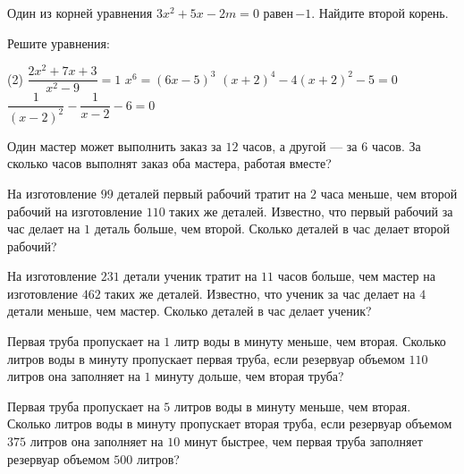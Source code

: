 \begin{class}[number=3]
	\begin{listofex}
		\item Один из корней уравнения \( 3x^2+5x-2m=0 \) равен \( -1 \). Найдите второй корень.
		\item Решите уравнения:
		\begin{tasks}(2)
			\task \( \dfrac{2x^2+7x+3}{x^2-9}=1 \)
			\task \( x^6=(6x-5)^3 \)
			\task \( (x+2)^4-4(x+2)^2-5=0 \)
			\task \( \dfrac{1}{(x-2)^2}-\dfrac{1}{x-2}-6=0 \)
		\end{tasks}
		\item Один мастер может выполнить заказ за \( 12 \) часов, а другой --- за \( 6 \) часов. За сколько часов выполнят заказ оба мастера, работая вместе?
		\item На изготовление \( 99 \) деталей первый рабочий тратит на \( 2 \) часа меньше, чем второй рабочий на изготовление \( 110 \) таких же деталей. Известно, что первый рабочий за час делает на \( 1 \) деталь больше, чем второй. Сколько деталей в час делает второй рабочий?
		\item На изготовление \( 231 \) детали ученик тратит на \( 11 \) часов больше, чем мастер на изготовление \( 462 \) таких же деталей. Известно, что ученик за час делает на \( 4 \) детали меньше, чем мастер. Сколько деталей в час делает ученик?
		\item Первая труба пропускает на \( 1 \) литр воды в минуту меньше, чем вторая. Сколько литров воды в минуту пропускает первая труба, если резервуар объемом \( 110 \) литров она заполняет на \( 1 \) минуту дольше, чем вторая труба?
		\item Первая труба пропускает на \( 5 \) литров воды в минуту меньше, чем вторая. Сколько литров воды в минуту пропускает вторая труба, если резервуар объемом \( 375 \) литров она заполняет на \( 10 \) минут быстрее, чем первая труба заполняет резервуар объемом \( 500 \) литров?
	\end{listofex}
\end{class}

